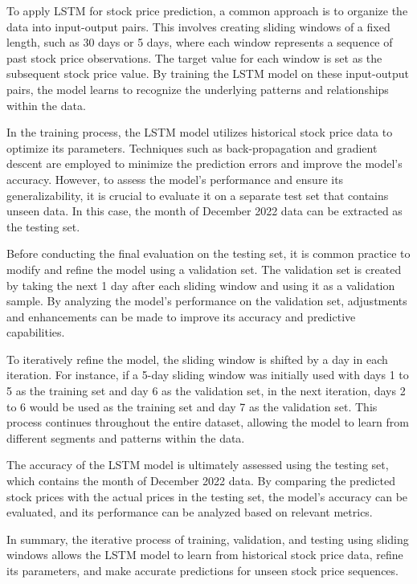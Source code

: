 \documentclass[conference]{IEEEtran}
\begin{document}
To apply LSTM for stock price prediction, a common approach is to organize the data into input-output pairs. This involves creating sliding windows of a fixed length, such as 30 days or 5 days, where each window represents a sequence of past stock price observations. The target value for each window is set as the subsequent stock price value. By training the LSTM model on these input-output pairs, the model learns to recognize the underlying patterns and relationships within the data.

In the training process, the LSTM model utilizes historical stock price data to optimize its parameters. Techniques such as back-propagation and gradient descent are employed to minimize the prediction errors and improve the model's accuracy. However, to assess the model's performance and ensure its generalizability, it is crucial to evaluate it on a separate test set that contains unseen data. In this case, the month of December 2022 data can be extracted as the testing set.

Before conducting the final evaluation on the testing set, it is common practice to modify and refine the model using a validation set. The validation set is created by taking the next 1 day after each sliding window and using it as a validation sample. By analyzing the model's performance on the validation set, adjustments and enhancements can be made to improve its accuracy and predictive capabilities.

To iteratively refine the model, the sliding window is shifted by a day in each iteration. For instance, if a 5-day sliding window was initially used with days 1 to 5 as the training set and day 6 as the validation set, in the next iteration, days 2 to 6 would be used as the training set and day 7 as the validation set. This process continues throughout the entire dataset, allowing the model to learn from different segments and patterns within the data.

The accuracy of the LSTM model is ultimately assessed using the testing set, which contains the month of December 2022 data. By comparing the predicted stock prices with the actual prices in the testing set, the model's accuracy can be evaluated, and its performance can be analyzed based on relevant metrics.

In summary, the iterative process of training, validation, and testing using sliding windows allows the LSTM model to learn from historical stock price data, refine its parameters, and make accurate predictions for unseen stock price sequences.
\end{document}
